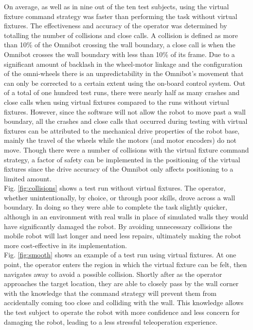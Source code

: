 \documentclass[onecolumn,10pt,final]{asme2ej}
\begin{document}
On average, as well as in nine out of the ten test subjects, using the virtual fixture command strategy was faster than performing the task without virtual fixtures. The effectiveness and accuracy of the operator was determined by totalling the number of collisions and close calls. A collision is defined as more than 10\% of the Omnibot crossing the wall boundary, a close call is when the Omnibot crosses the wall boundary with less than 10\% of its frame. Due to a significant amount of backlash in the wheel-motor linkage and the configuration of the omni-wheels there is an unpredictability in the Omnibot's movement that can only be corrected to a certain extent using the on-board control system. Out of a total of one hundred test runs, there were nearly half as many crashes and close calls when using virtual fixtures compared to the runs without virtual fixtures. However, since the software will not allow the robot to move past a wall boundary, all the crashes and close calls that occurred during testing with virtual fixtures can be attributed to the mechanical drive properties of the robot base, mainly the travel of the wheels while the motors (and motor encoders) do not move. Though there were a number of collisions with the virtual fixture command strategy, a factor of safety can be implemented in the positioning of the virtual fixtures since the drive accuracy of the Omnibot only affects positioning to a limited amount.\\

Fig. \ref{fig:collisions} shows a test run without virtual fixtures. The operator, whether unintentionally, by choice, or through poor skills, drove across a wall boundary. In doing so they were able to complete the task slightly quicker, although in an environment with real walls in place of simulated walls they would have significantly damaged the robot. By avoiding unnecessary collisions the mobile robot will last longer and need less repairs, ultimately making the robot more cost-effective in its implementation.\\

Fig. \ref{fig:smooth} shows an example of a test run using virtual fixtures. At one point, the operator enters the region in which the virtual fixture can be felt, then navigates away to avoid a possible collision. Shortly after as the operator approaches the target location, they are able to closely pass by the wall corner with the knowledge that the command strategy will prevent them from accidentally coming too close and colliding with the wall. This knowledge allows the test subject to operate the robot with more confidence and less concern for damaging the robot, leading to a less stressful teleoperation experience.\\
\end{document}

